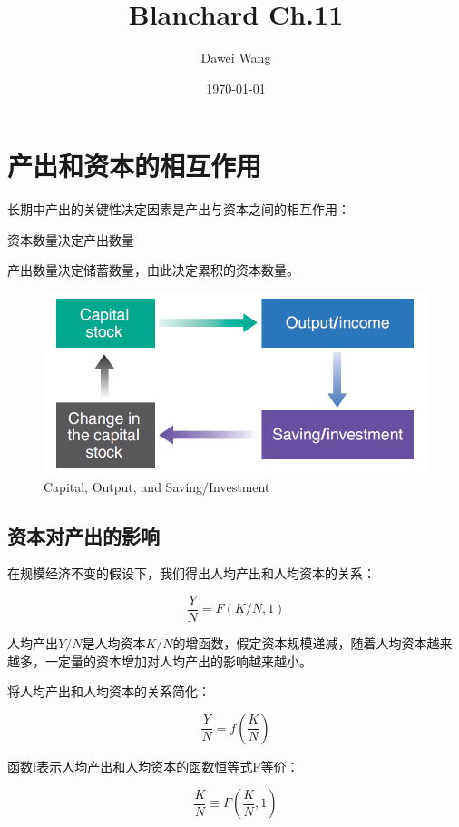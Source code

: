 \documentclass{article}
\title{Blanchard Ch.11}
\author{Dawei Wang}
\date{\today}
\begin{document}
	\maketitle

\section{产出和资本的相互作用}

长期中产出的关键性决定因素是产出与资本之间的相互作用：

资本数量决定产出数量

产出数量决定储蓄数量，由此决定累积的资本数量。

\begin{figure}[H] %
	\centering %
	\includegraphics[width=1\textwidth]{11_1} %
	\caption{Capital, Output, and
		Saving/Investment} %
	\label{Fig.main2} %
\end{figure}

\subsection{资本对产出的影响}

在规模经济不变的假设下，我们得出人均产出和人均资本的关系：

\[
\frac{Y}{N}=F(K/N,1)
\]

人均产出$ Y/N $是人均资本$ K/N $的增函数，假定资本规模递减，随着人均资本越来越多，一定量的资本增加对人均产出的影响越来越小。

将人均产出和人均资本的关系简化：

\[
\frac{Y}{N}=f(\frac{K}{N})
\]

函数f表示人均产出和人均资本的函数恒等式F等价：

\[
\frac{K}{N}\equiv F(\frac{K}{N},1)
\]
\end{document}
